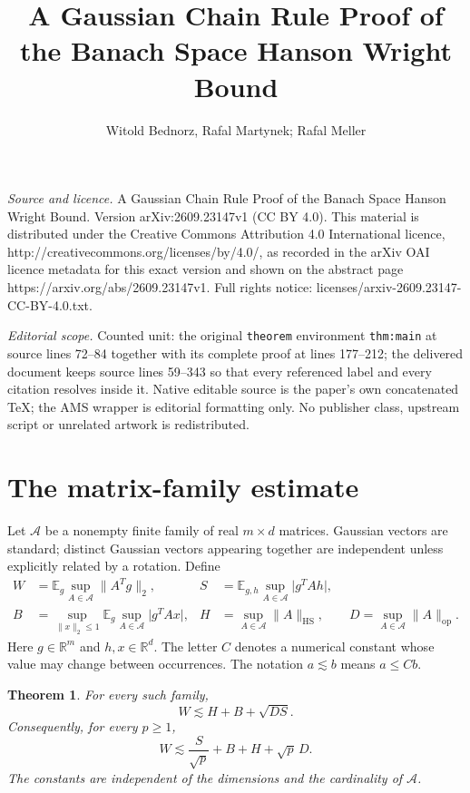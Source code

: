 \documentclass[10pt,a4paper]{amsart}
\numberwithin{equation}{section}
\newtheorem{theorem}{Theorem}[section]
\newcommand{\E}{\mathbb E}
\newcommand{\R}{\mathbb R}
\newcommand{\cA}{\mathcal A}
\newcommand{\norm}[1]{\lVert #1\rVert}
\newcommand{\abs}[1]{\lvert #1\rvert}
\newcommand{\HS}{\mathrm{HS}}
\newcommand{\op}{\mathrm{op}}
\begin{document}
\title[A Gaussian Chain Rule Proof of the Banach Space Hanson Wrigh]{A Gaussian Chain Rule Proof of the Banach Space Hanson Wright Bound}
\author{Witold Bednorz, Rafal Martynek; Rafal Meller}
\date{}
\maketitle
\noindent\emph{Source and licence.} A Gaussian Chain Rule Proof of the Banach Space Hanson Wright Bound. Version arXiv:2609.23147v1 (CC BY 4.0). This material is distributed under the Creative Commons Attribution 4.0 International licence, http://creativecommons.org/licenses/by/4.0/, as recorded in the arXiv OAI licence metadata for this exact version and shown on the abstract page https://arxiv.org/abs/2609.23147v1. Full rights notice: licenses/arxiv-2609.23147-CC-BY-4.0.txt.\par\smallskip
\noindent\textit{Editorial scope.} Counted unit: the original \texttt{theorem} environment \texttt{thm:main} at source lines 72--84 together with its complete proof at lines 177--212; the delivered document keeps source lines 59--343 so that every referenced label and every citation resolves inside it. Native editable source is the paper's own concatenated TeX; the AMS wrapper is editorial formatting only. No publisher class, upstream script or unrelated artwork is redistributed.
\section{The matrix-family estimate}

Let $\cA$ be a nonempty finite family of real $m\times d$ matrices. Gaussian vectors are standard; distinct Gaussian vectors appearing together are independent unless explicitly related by a rotation. Define
\begin{align}
 W&=\E_g\sup_{A\in\cA}\norm{A^Tg}_2,
 &S&=\E_{g,h}\sup_{A\in\cA}\abs{g^TAh},\label{eq:WS}\\
 B&=\sup_{\norm{x}_2\le1}\E_g\sup_{A\in\cA}\abs{g^TAx},
 &H&=\sup_{A\in\cA}\norm{A}_{\HS},
 \qquad D=\sup_{A\in\cA}\norm{A}_{\op}.
 \label{eq:BHD}
\end{align}
Here $g\in\R^m$ and $h,x\in\R^d$. The letter $C$ denotes a numerical constant whose value may change between occurrences. The notation $a\lesssim b$ means $a\le Cb$.


\begin{theorem}\label{thm:main}
For every such family,
\begin{equation}
 \boxed{\quad W\lesssim H+B+\sqrt{DS}.\quad}
 \label{eq:main}
\end{equation}
Consequently, for every $p\ge1$,
\begin{equation}
 W\lesssim \frac{S}{\sqrt p}+B+H+\sqrt p\,D.
 \label{eq:pbound}
\end{equation}
The constants are independent of the dimensions and the cardinality of $\cA$.
\end{theorem}
\end{document}
